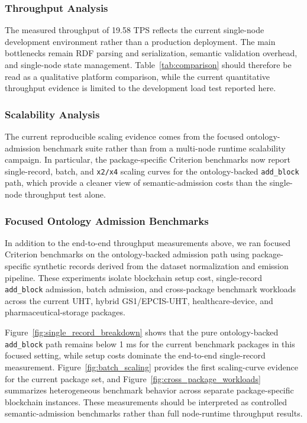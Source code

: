 \documentclass[preprint,review,12pt,authoryear]{elsarticle}
\begin{document}
\subsubsection{Throughput Analysis}

The measured throughput of 19.58 TPS reflects the current single-node development environment rather than a production deployment. The main bottlenecks remain RDF parsing and serialization, semantic validation overhead, and single-node state management. Table~\ref{tab:comparison} should therefore be read as a qualitative platform comparison, while the current quantitative throughput evidence is limited to the development load test reported here.

\subsubsection{Scalability Analysis}

The current reproducible scaling evidence comes from the focused ontology-admission benchmark suite rather than from a multi-node runtime scalability campaign. In particular, the package-specific Criterion benchmarks now report single-record, batch, and \texttt{x2/x4} scaling curves for the ontology-backed \texttt{add\_block} path, which provide a cleaner view of semantic-admission costs than the single-node throughput test alone.

\subsubsection{Focused Ontology Admission Benchmarks}

In addition to the end-to-end throughput measurements above, we ran focused Criterion benchmarks on the ontology-backed admission path using package-specific synthetic records derived from the dataset normalization and emission pipeline. These experiments isolate blockchain setup cost, single-record \texttt{add\_block} admission, batch admission, and cross-package benchmark workloads across the current UHT, hybrid GS1/EPCIS-UHT, healthcare-device, and pharmaceutical-storage packages.



Figure~\ref{fig:single_record_breakdown} shows that the pure ontology-backed \texttt{add\_block} path remains below 1 ms for the current benchmark packages in this focused setting, while setup costs dominate the end-to-end single-record measurement. Figure~\ref{fig:batch_scaling} provides the first scaling-curve evidence for the current package set, and Figure~\ref{fig:cross_package_workloads} summarizes heterogeneous benchmark behavior across separate package-specific blockchain instances. These measurements should be interpreted as controlled semantic-admission benchmarks rather than full node-runtime throughput results.
\end{document}
